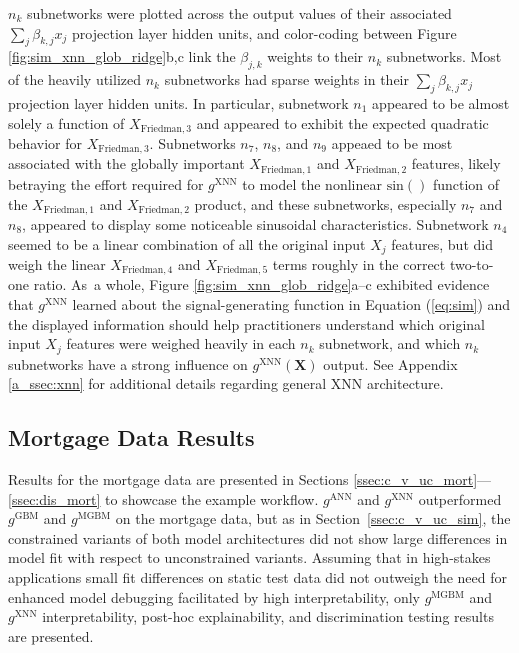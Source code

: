 \documentclass[information,article,accept,moreauthors,pdftex]{Definitions/mdpi}
\begin{document}
{{{  $n_k$ subnetworks were plotted across the output values of their associated $\sum_j\beta_{k,j}x_j$ projection layer hidden units, and color-coding between Figure \ref{fig:sim_xnn_glob_ridge}{b},c link the $\beta_{j,k}$ weights to their $n_k$ subnetworks. Most of the heavily utilized $n_k$ subnetworks had sparse weights in their $\sum_j\beta_{k,j}x_j$ projection layer hidden units. In particular, subnetwork $n_1$ appeared to be almost solely a function of $X_{\text{Friedman}, 3}$ and appeared to exhibit the expected quadratic behavior for $X_{\text{Friedman}, 3}$.  Subnetworks $n_7$, $n_8$, and $n_9$ appeaed to be most associated with the globally important $X_{\text{Friedman}, 1}$ and $X_{\text{Friedman}, 2}$ features, likely betraying the effort required for $g^{\text{XNN}}$ to model the nonlinear $\text{sin}()$ function of the $X_{\text{Friedman}, 1}$ and $X_{\text{Friedman}, 2}$ product, and these subnetworks, especially $n_7$ and $n_8$, appeared to display some noticeable sinusoidal characteristics. Subnetwork $n_4$ seemed to be a linear combination of all the original input $X_j$ features, but did weigh the linear $X_{\text{Friedman},4}$ and $X_{\text{Friedman},5}$ terms roughly in the correct two-to-one ratio. As~a whole, Figure \ref{fig:sim_xnn_glob_ridge}a--c exhibited evidence that $g^\text{XNN}$ learned about the signal-generating function in Equation (\ref{eq:sim}) and the displayed information should help practitioners understand which original input $X_j$ features were weighed heavily in each $n_k$ subnetwork, and which $n_k$ subnetworks have a strong influence on $g^\text{XNN}(\mathbf{X})$ output. See Appendix \ref{a_ssec:xnn} for additional details regarding general XNN architecture.

\subsection{Mortgage Data Results}

Results for the mortgage data are presented in Sections \ref{ssec:c_v_uc_mort}---\ref{ssec:dis_mort} to showcase the example workflow.  $g^\text{ANN}$ and $g^\text{XNN}$ outperformed $g^\text{GBM}$ and $g^\text{MGBM}$ on the mortgage data, but as in Section~\ref{ssec:c_v_uc_sim}, the constrained variants of both model architectures did not show large differences in model fit with respect to unconstrained variants. Assuming that in high-stakes applications small fit differences on static test data did not outweigh the need for enhanced model debugging facilitated by high interpretability, only $g^\text{MGBM}$ and $g^\text{XNN}$ interpretability, post-hoc explainability, and discrimination testing results are presented. 

}}}
\end{document}
